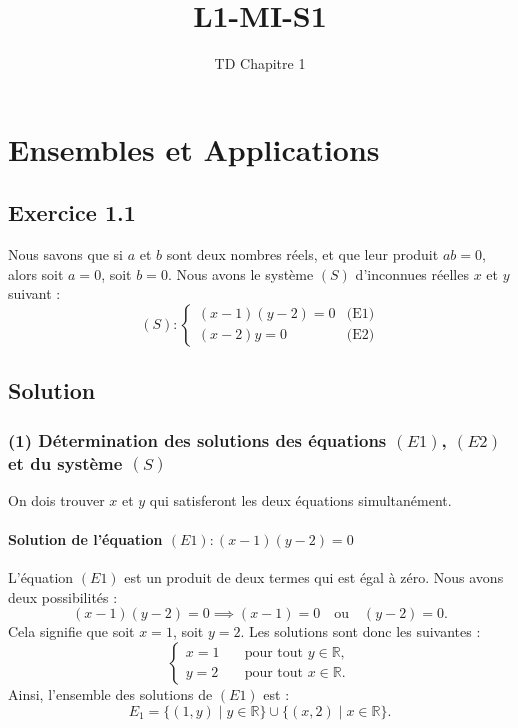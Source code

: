 \documentclass[a4paper,oneside,12pt]{amsbook}
\title{L1-MI-S1}
\author{TD Chapitre 1}
\theoremstyle{definition}
\theoremstyle{remark}
\begin{document}
\maketitle


\setcounter{tocdepth}{1}
\tableofcontents
\mainmatter

\chapter{Ensembles et Applications}
\section*{Exercice 1.1}
Nous savons que si \( a \) et \( b \) sont deux nombres réels, et que leur produit \( ab = 0 \), alors soit \( a = 0 \), soit \( b = 0 \). Nous avons le système \((S)\) d'inconnues réelles \(x\) et \(y\) suivant :
\[
(S) :
\begin{cases}
    (x - 1)(y - 2) = 0 & \text{(E1)} \\
    (x - 2)y = 0 & \text{(E2)}
\end{cases}
\]
\section*{Solution}
\subsection*{(1) Détermination des solutions des équations \((E1)\), \((E2)\) et du système \((S)\)}
On dois trouver \( x \) et \( y \) qui satisferont les deux équations simultanément.
\subsubsection*{Solution de l'équation \((E1) : (x - 1)(y - 2) = 0\)}

L'équation \((E1)\) est un produit de deux termes qui est égal à zéro. Nous avons deux possibilités :
\[
(x - 1)(y - 2) = 0 \implies (x - 1) = 0 \quad \text{ou} \quad (y - 2) = 0.
\]
Cela signifie que soit \(x = 1\), soit \(y = 2\). Les solutions sont donc les suivantes :
\[
\begin{cases}
    x = 1 \quad &\text{pour tout } y \in \mathbb{R}, \\
    y = 2 \quad &\text{pour tout } x \in \mathbb{R}.
\end{cases}
\]
Ainsi, l'ensemble des solutions de \((E1)\) est :
\[
E_1 = \{ (1, y) \mid y \in \mathbb{R} \} \cup \{ (x, 2) \mid x \in \mathbb{R} \}.
\]
\end{document}
